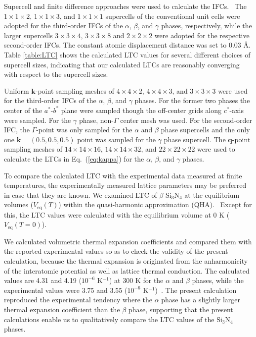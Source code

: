 \documentclass[twocolumn,amsmath,amssymb,a4paper,prb,superscriptaddress,floatfix]{revtex4-1}
\begin{document}
Supercell and finite difference approaches were used to calculate the
IFCs.~\cite{wei-supercell} The $1\times 1\times2$, $1\times 1\times3$, and $1\times
1\times1$ supercells of the conventional unit cells were adopted for the
third-order IFCs of the $\alpha$, $\beta$, and $\gamma$ phases,
respectively, while the larger supercells $3\times 3\times4$, $3\times
3\times8$ and $2\times 2\times2$ were adopted for the respective
second-order IFCs. The constant atomic displacement distance was set to
0.03 \AA. Table \ref{table:LTC} shows the calculated LTC values for
several different choices of supercell sizes, indicating that our
calculated LTCs are reasonably converging with respect to the supercell
sizes.

Uniform $\mathbf{k}$-point sampling meshes of $4\times 4\times 2$,
$4\times 4\times 3$, and $3\times 3\times 3$ were used for the
third-order IFCs of the $\alpha$, $\beta$, and $\gamma$ phases. For the
former two phases the center of the $a^*$-$b^*$ plane were sampled
though the off-center grids along $c^*$-axis were sampled. For the
$\gamma$ phase, non-$\Gamma$ center mesh was used. For the second-order
IFC, the $\Gamma$-point was only sampled for the $\alpha$ and $\beta$
phase supercells and the only one $\mathbf{k}=(0.5, 0.5, 0.5)$ point was
sampled for the $\gamma$ phase supercell. The $\mathbf{q}$-point
sampling meshes of $14\times 14\times 16$, $14\times 14\times 32$, and
$22\times 22\times 22$ were used to calculate the LTCs in Eq.~(\ref{eq:kappa})
 for
the $\alpha$, $\beta$, and $\gamma$ phases.

To compare the calculated LTC with the experimental data measured at
finite temperatures, the experimentally measured lattice parameters may 
be preferred in case that they are known. We examined LTC of
$\beta$-Si$_3$N$_4$ at the equilibrium volumes ($V_\text{eq}(T)$) within the
quasi-harmonic approximation (QHA).~\cite{dove-p76} Except for this, the LTC values
were calculated with the equilibrium volume at 0 K ($V_\text{eq}(T=0)$).

We calculated volumetric thermal expansion coefficients and compared
them with the reported experimental values so as to check the validity
of the present calculation, because the thermal expansion is originated
from the anharmonicity of the interatomic potential as well as lattice
thermal conduction. The calculated values are 4.31 and 4.19 ($10^{-6}$
K$^{-1}$) at 300 K for the $\alpha$ and $\beta$ phases, while the
experimental values were 3.75 and 3.55 ($10^{-6}$ K$^{-1}$)~\cite{minikayev-alpha}. The present
calculation reproduced the experimental tendency where the $\alpha$
phase has a slightly larger thermal expansion coefficient than the
$\beta$ phase, supporting that the present calculations enable us to
qualitatively compare the LTC values of the Si$_3$N$_4$ phases.
\end{document}
